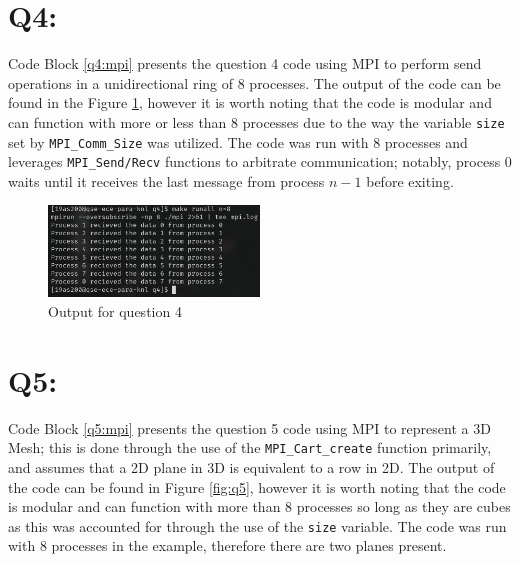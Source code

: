 \documentclass[11pt]{article}
\begin{document}
\newpage
\section*{Q4:}
Code Block \ref{q4:mpi} presents the question 4 code using MPI to perform send operations in a unidirectional ring of 8 processes.
The output of the code can be found in the Figure \ref{fig:q4}, however it is worth noting that the code is modular and can function with more or less than 8 processes due to the way the variable \texttt{size} set by \texttt{MPI\_Comm\_Size} was utilized.
The code was run with 8 processes and leverages \texttt{MPI\_Send/Recv} functions to arbitrate communication; notably, process 0 waits until it receives the last message from process $n-1$ before exiting.



\begin{figure}[H]
\centering
    \includegraphics[width=0.5\textwidth]{./images/q4.png}
\caption{Output for question 4}
\label{fig:q4}
\end{figure}

\newpage

\section*{Q5:}

Code Block \ref{q5:mpi} presents the question 5 code using MPI to represent a 3D Mesh; this is done through the use of the \texttt{MPI\_Cart\_create} function primarily, and assumes that a 2D plane in 3D is equivalent to a row in 2D.
The output of the code can be found in Figure \ref{fig:q5}, however it is worth noting that the code is modular and can function with more than 8 processes so long as they are cubes as this was accounted for through the use of the \texttt{size} variable.
The code was run with 8 processes in the example, therefore there are two planes present.


\end{document}
